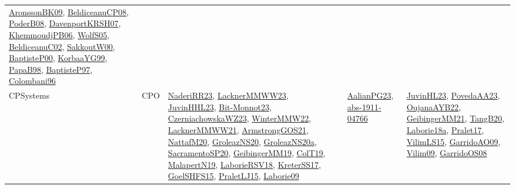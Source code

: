 {\begin{longtable}{lp{3cm}>{\raggedright}p{6cm}>{\raggedright}p{6cm}p{8cm}}
\href{papers/AronssonBK09.pdf}{AronssonBK09}\cite{AronssonBK09}, \href{papers/BeldiceanuCP08.pdf}{BeldiceanuCP08}\cite{BeldiceanuCP08}, \href{papers/PoderB08.pdf}{PoderB08}\cite{PoderB08}, \href{papers/DavenportKRSH07.pdf}{DavenportKRSH07}\cite{DavenportKRSH07}, \href{papers/KhemmoudjPB06.pdf}{KhemmoudjPB06}\cite{KhemmoudjPB06}, \href{papers/WolfS05.pdf}{WolfS05}\cite{WolfS05}, \href{papers/BeldiceanuC02.pdf}{BeldiceanuC02}\cite{BeldiceanuC02}, \href{articles/SakkoutW00.pdf}{SakkoutW00}\cite{SakkoutW00}, \href{articles/BaptisteP00.pdf}{BaptisteP00}\cite{BaptisteP00}, \href{papers/KorbaaYG99.pdf}{KorbaaYG99}\cite{KorbaaYG99}, \href{articles/PapaB98.pdf}{PapaB98}\cite{PapaB98}, \href{papers/BaptisteP97.pdf}{BaptisteP97}\cite{BaptisteP97}, \href{papers/Colombani96.pdf}{Colombani96}\cite{Colombani96}\\
CPSystems & CPO & \href{articles/NaderiRR23.pdf}{NaderiRR23}\cite{NaderiRR23}, \href{articles/LacknerMMWW23.pdf}{LacknerMMWW23}\cite{LacknerMMWW23}, \href{papers/JuvinHHL23.pdf}{JuvinHHL23}\cite{JuvinHHL23}, \href{papers/Bit-Monnot23.pdf}{Bit-Monnot23}\cite{Bit-Monnot23}, \href{articles/CzerniachowskaWZ23.pdf}{CzerniachowskaWZ23}\cite{CzerniachowskaWZ23}, \href{papers/WinterMMW22.pdf}{WinterMMW22}\cite{WinterMMW22}, \href{papers/LacknerMMWW21.pdf}{LacknerMMWW21}\cite{LacknerMMWW21}, \href{papers/ArmstrongGOS21.pdf}{ArmstrongGOS21}\cite{ArmstrongGOS21}, \href{papers/NattafM20.pdf}{NattafM20}\cite{NattafM20}, \href{papers/GroleazNS20.pdf}{GroleazNS20}\cite{GroleazNS20}, \href{papers/GroleazNS20a.pdf}{GroleazNS20a}\cite{GroleazNS20a}, \href{articles/SacramentoSP20.pdf}{SacramentoSP20}\cite{SacramentoSP20}, \href{papers/GeibingerMM19.pdf}{GeibingerMM19}\cite{GeibingerMM19}, \href{papers/ColT19.pdf}{ColT19}\cite{ColT19}, \href{papers/MalapertN19.pdf}{MalapertN19}\cite{MalapertN19}, \href{articles/LaborieRSV18.pdf}{LaborieRSV18}\cite{LaborieRSV18}, \href{articles/KreterSS17.pdf}{KreterSS17}\cite{KreterSS17}, \href{articles/GoelSHFS15.pdf}{GoelSHFS15}\cite{GoelSHFS15}, \href{papers/PraletLJ15.pdf}{PraletLJ15}\cite{PraletLJ15}, \href{papers/Laborie09.pdf}{Laborie09}\cite{Laborie09} & \href{papers/AalianPG23.pdf}{AalianPG23}\cite{AalianPG23}, \href{articles/abs-1911-04766.pdf}{abs-1911-04766}\cite{abs-1911-04766} & \href{papers/JuvinHL23.pdf}{JuvinHL23}\cite{JuvinHL23}, \href{papers/PovedaAA23.pdf}{PovedaAA23}\cite{PovedaAA23}, \href{papers/OujanaAYB22.pdf}{OujanaAYB22}\cite{OujanaAYB22}, \href{papers/GeibingerMM21.pdf}{GeibingerMM21}\cite{GeibingerMM21}, \href{papers/TangB20.pdf}{TangB20}\cite{TangB20}, \href{papers/Laborie18a.pdf}{Laborie18a}\cite{Laborie18a}, \href{papers/Pralet17.pdf}{Pralet17}\cite{Pralet17}, \href{papers/VilimLS15.pdf}{VilimLS15}\cite{VilimLS15}, \href{articles/GarridoAO09.pdf}{GarridoAO09}\cite{GarridoAO09}, \href{papers/Vilim09.pdf}{Vilim09}\cite{Vilim09}, \href{articles/GarridoOS08.pdf}{GarridoOS08}\cite{GarridoOS08}\\

\end{longtable}}
